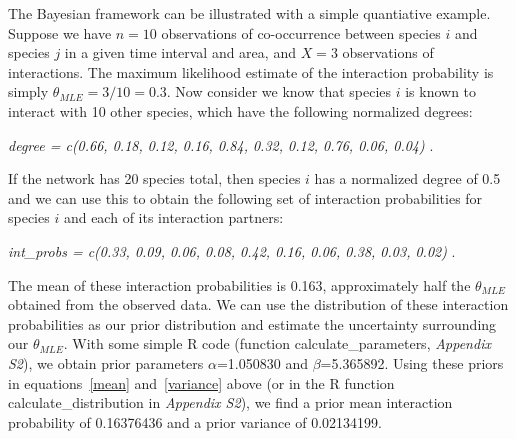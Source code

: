 ﻿\documentclass[12pt]{article}
\begin{document}
  The Bayesian framework can be illustrated with a simple quantiative example. Suppose we have $n = 10$ observations of co-occurrence between species $i$ and species $j$ in a given time interval and area, and $X = 3$ observations of interactions. The maximum likelihood estimate of the interaction probability is simply $\theta_{MLE} = 3/10 = 0.3$. 
   Now consider we know that species $i$ is known to interact with 10 other species, which have the following normalized degrees:

    \vspace{12pt}
    \noindent\emph{
       degree = c(0.66, 0.18, 0.12, 0.16, 0.84, 0.32, 0.12, 0.76, 0.06, 0.04)
        }.
      \vspace{12pt}

    If the network has 20 species total, then species $i$ has a normalized degree of 0.5 and
    we can use this to obtain the following set of interaction probabilities for species $i$ and each of its interaction partners:

    \vspace{12pt}
    \noindent\emph{
       int\_probs = c(0.33, 0.09, 0.06, 0.08, 0.42, 0.16, 0.06, 0.38, 0.03, 0.02) }.
      \vspace{12pt}


    The mean of these interaction probabilities is 0.163, approximately half the $\theta_{MLE}$ obtained from the observed data. We can use the distribution of these interaction probabilities as our prior distribution and estimate the uncertainty surrounding our $\theta_{MLE}$. With some simple R code (function calculate\_parameters, \emph{Appendix S2}), we obtain prior parameters $\alpha$=1.050830
    and $\beta$=5.365892. Using these priors in equations~\ref{mean} 
    and~\ref{variance} above (or in the R function calculate\_distribution in \emph{Appendix S2}), we find a prior mean interaction probability of 0.16376436 and a prior variance of 0.02134199.
\end{document}

